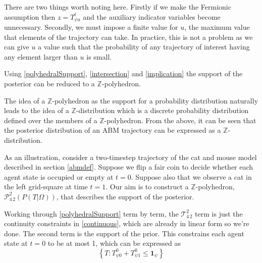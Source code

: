 \documentclass{article}
\begin{document}
There are two things worth noting here. Firstly if we make the Fermionic assumption then $z = T^t_{\psi a}$ and the auxiliary indicator variables become unnecessary. Secondly, we must impose a finite value for $u$, the maximum value that elements of the trajectory can take. In practice, this is not a problem as we can give $u$ a value such that the probability of any trajectory of interest having any element larger than $u$ is small.

Using \eqref{polyhedralSupport}, \eqref{intersection} and \eqref{implication} the support of the posterior can be reduced to a $\mathbb{Z}$-polyhedron.

The idea of a $\mathbb{Z}$-polyhedron as the support for a probability distribution naturally leads to the idea of a $\mathbb{Z}$-distribution which is a discrete probability distribution defined over the members of a $\mathbb{Z}$-polyhedron. From the above, it can be seen that the posterior distribution of an ABM trajectory can be expressed as a $\mathbb{Z}$-distribution.

As an illustration, consider a two-timestep trajectory of the cat and mouse model described in section \ref{abmdef}. Suppose we flip a fair coin to decide whether each agent state is occupied or empty at $t=0$. Suppose also that we observe a cat in the left grid-square at time $t=1$. Our aim is to construct a $\mathbb{Z}$-polyhedron, $\mathcal{P}^2_{4\,2}(P(T|\Omega))$, that describes the support of the posterior.

Working through \eqref{polyhedralSupport} term by term, the $\mathcal{T}^2_{4\,2}$ term is just the continuity constraints in \eqref{continuous}, which are already in linear form so we're done. The second term is the support of the prior. This constrains each agent state at $t=0$ to be at most 1, which can be expressed as
\[
\left\{T:T^0_{\psi 0} + T^0_{\psi 1} \le \mathbf{1}_{\psi}\right\}
\]
\end{document}
